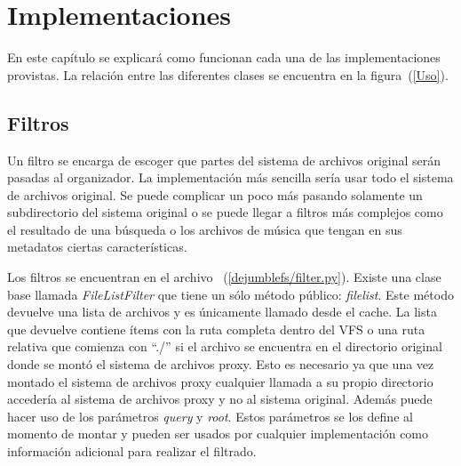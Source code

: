 \chapter{Implementaciones}
\ifpdf
    \graphicspath{{Chapter3/Chapter3Figs/PNG/}{Chapter3/Chapter3Figs/PDF/}{Chapter3/Chapter3Figs/}}
\else
    \graphicspath{{Chapter3/Chapter3Figs/EPS/}{Chapter3/Chapter3Figs/}}
\fi

En este capítulo se explicará como funcionan cada una de las implementaciones provistas. La relación entre las diferentes clases se encuentra en la figura~(\ref{Uso}).




\section{Filtros}

Un filtro se encarga de escoger que partes del sistema de archivos original serán pasadas al organizador. La implementación más sencilla sería usar todo el sistema de archivos original. Se puede complicar un poco más pasando solamente un subdirectorio del sistema original o se puede llegar a filtros más complejos como el resultado de una búsqueda o los archivos de música que tengan en sus metadatos ciertas características.


Los filtros se encuentran en el archivo ~(\ref{dejumblefs/filter.py}). Existe una clase base llamada \textit{FileListFilter} que tiene un sólo método público: \textit{filelist}. Este método devuelve una lista de archivos y es únicamente llamado desde el cache. La lista que devuelve contiene ítems con la ruta completa dentro del VFS o una ruta relativa que comienza con ``./'' si el archivo se encuentra en el directorio original donde se montó el sistema de archivos proxy. Esto es necesario ya que una vez montado el sistema de archivos proxy cualquier llamada a su propio directorio accedería al sistema de archivos proxy y no al sistema original. Además puede hacer uso de los parámetros \textit{query} y \textit{root}. Estos parámetros se los define al momento de montar y pueden ser usados por cualquier implementación como información adicional para realizar el filtrado.

